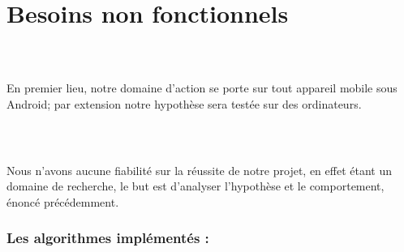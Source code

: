 \chapter{Besoins non fonctionnels}

\paragraph{\\}
	En premier lieu, notre domaine d'action se porte sur tout appareil mobile sous Android; par extension notre hypothèse sera testée sur des ordinateurs.

\paragraph{\\}
	Nous n'avons aucune fiabilité sur la réussite de notre projet, en effet étant un domaine de recherche, le but est d'analyser l'hypothèse et le comportement, énoncé précédemment.

\subsection*{Les algorithmes implémentés :\\}

